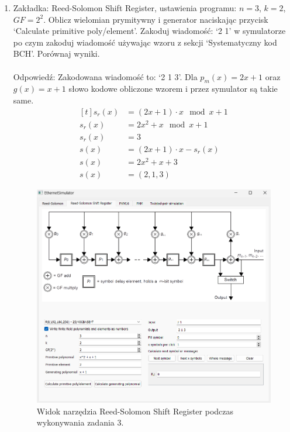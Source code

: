 \begin{enumerate}
    \item Zakładka: Reed-Solomon Shift Register, ustawienia programu:
    $n = 3$, $k = 2$, $GF = 2^2$. Oblicz wielomian prymitywny i generator naciskając
    przycisk `Calculate primitive poly/element'.
    Zakoduj wiadomość: `2 1' w symulatorze po czym zakoduj wiadomość
    używając wzoru z sekcji `Systematyczny kod BCH'. Porównaj wyniki.
    \\ \\
    Odpowiedź: Zakodowana wiadomość to: `2 1 3'. Dla $p_m(x) = 2x + 1$ oraz $g(x) = x + 1$ słowo kodowe
    obliczone wzorem i przez symulator są takie same.
    \begin{equation*}
        \begin{aligned}[t]
            s_r(x) &= (2x+1) \cdot x \mod x + 1 \\
            s_r(x) &= 2x^2 + x \mod x + 1 \\
            s_r(x) &= 3 \\
            s(x) &= (2x+1) \cdot x - s_r(x) \\
            s(x) &= 2x^2 + x + 3 \\
            s(x) &= (2,1,3)
        \end{aligned}
    \end{equation*}

    

    \begin{figure}[H]
        \centering
        \includegraphics[width=\textwidth]{images/rozwiazania_3.png}
        \caption{Widok narzędzia Reed-Solomon Shift Register podczas wykonywania zadania 3.}
        \label{fig:rozwiazania_3}
    \end{figure}
    

\end{enumerate}
